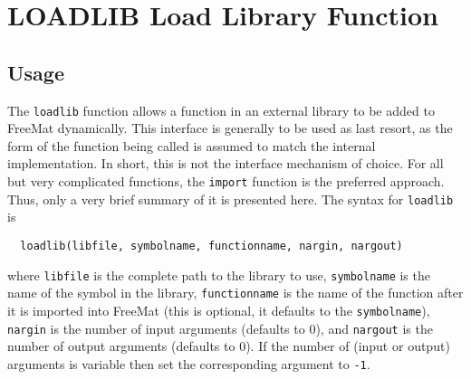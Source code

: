 \section{LOADLIB Load Library Function}

\subsection{Usage}

The \verb|loadlib| function allows a function in an external library
to be added to FreeMat dynamically.  This interface is generally
to be used as last resort, as the form of the function being called
is assumed to match the internal implementation.  In short, this
is not the interface mechanism of choice.  For all but very complicated
functions, the \verb|import| function is the preferred approach. Thus,
only a very brief summary of it is presented here.  The syntax
for \verb|loadlib| is
\begin{verbatim}
  loadlib(libfile, symbolname, functionname, nargin, nargout)
\end{verbatim}
where \verb|libfile| is the complete path to the library to use, \verb|symbolname|
is the name of the symbol in the library, \verb|functionname| is the name
of the function after it is imported into FreeMat (this is optional, it
defaults to the \verb|symbolname|), \verb|nargin| is the number of input arguments
(defaults to 0), and \verb|nargout| is the number of output arguments (defaults
to 0).  If the number of (input or output) arguments is variable then
set the corresponding argument to \verb|-1|.

